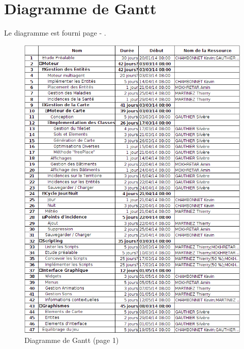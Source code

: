 \documentclass[a4paper]{article}
\newcommand{\alinea}{\hspace*{0.5cm}}
\begin{document}
    \section{Diagramme de Gantt}
      \alinea Le diagramme est fourni page \pageref{DiagGantt1} - \pageref{DiagGantt2}.
      \begin{figure}
        \begin{center}
          \includegraphics[scale=0.5]{img/gantt_1.png}
        \end{center}
        \label{DiagGantt1}
        \caption{Diagramme de Gantt (page 1)}
      \end{figure}
\end{document}
